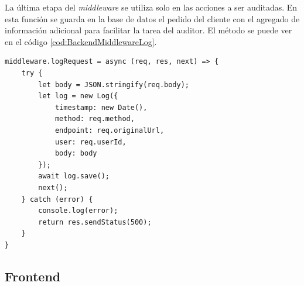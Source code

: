 La última etapa del \emph{middleware} se utiliza solo en las acciones a ser auditadas.
En esta función se guarda en la base de datos el pedido del cliente con el agregado de información adicional para facilitar la tarea del auditor. El método se puede ver en el código \ref{cod:BackendMiddlewareLog}.

\begin{lstlisting}[label=cod:BackendMiddlewareLog,caption=Persistencia de la operación]
middleware.logRequest = async (req, res, next) => {
    try {
        let body = JSON.stringify(req.body);
        let log = new Log({
            timestamp: new Date(),
            method: req.method,
            endpoint: req.originalUrl,
            user: req.userId,
            body: body
        });
        await log.save();
        next();
    } catch (error) {
        console.log(error);
        return res.sendStatus(500);
    }
}
\end{lstlisting}

\subsection{Frontend}
